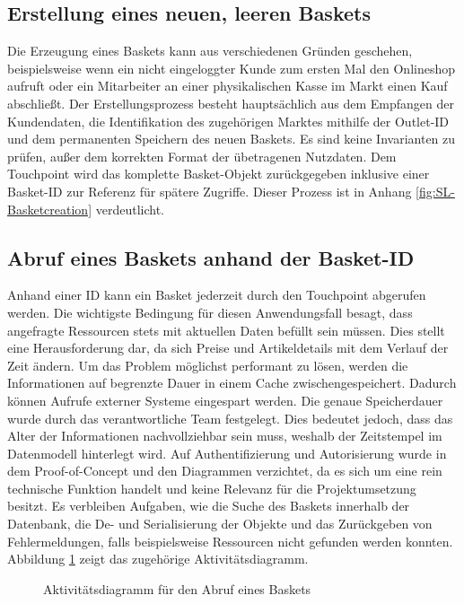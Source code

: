 \subsection{Erstellung eines neuen, leeren Baskets}

Die Erzeugung eines Baskets kann aus verschiedenen Gründen geschehen, beispielsweise wenn ein nicht eingeloggter Kunde zum ersten Mal den Onlineshop aufruft oder ein Mitarbeiter an einer physikalischen Kasse im Markt einen Kauf abschließt. Der Erstellungsprozess besteht hauptsächlich aus dem Empfangen der Kundendaten, die Identifikation des zugehörigen Marktes mithilfe der Outlet-ID und dem permanenten Speichern des neuen Baskets. Es sind keine Invarianten zu prüfen, außer dem korrekten Format der übetragenen Nutzdaten. Dem Touchpoint wird das komplette Basket-Objekt zurückgegeben inklusive einer Basket-ID zur Referenz für spätere Zugriffe. Dieser Prozess ist in Anhang \ref{fig:SL-Basketcreation} verdeutlicht. 

\pagebreak

\subsection{Abruf eines Baskets anhand der Basket-ID}

Anhand einer ID kann ein Basket jederzeit durch den Touchpoint abgerufen werden. Die wichtigste Bedingung für diesen Anwendungsfall besagt, dass angefragte Ressourcen stets mit aktuellen Daten befüllt sein müssen. Dies stellt eine Herausforderung dar, da sich Preise und Artikeldetails mit dem Verlauf der Zeit ändern. Um das Problem möglichst performant zu lösen, werden die Informationen auf begrenzte Dauer in einem Cache zwischengespeichert. Dadurch können Aufrufe externer Systeme eingespart werden. Die genaue Speicherdauer wurde durch das verantwortliche Team festgelegt. Dies bedeutet jedoch, dass das Alter der Informationen nachvollziehbar sein muss, weshalb der Zeitstempel im Datenmodell hinterlegt wird. Auf Authentifizierung und Autorisierung wurde in dem Proof-of-Concept und den Diagrammen verzichtet, da es sich um eine rein technische Funktion handelt und keine Relevanz für die Projektumsetzung besitzt. Es verbleiben Aufgaben, wie die Suche des Baskets innerhalb der Datenbank, die De- und Serialisierung der Objekte und das Zurückgeben von Fehlermeldungen, falls beispielsweise Ressourcen nicht gefunden werden konnten. Abbildung \ref{fig:SL-Basketabruf} zeigt das zugehörige Aktivitätsdiagramm.

\begin{figure}[H]
	\centering
	
	\caption{Aktivitätsdiagramm für den Abruf eines Baskets}
	\label{fig:SL-Basketabruf}
\end{figure}

